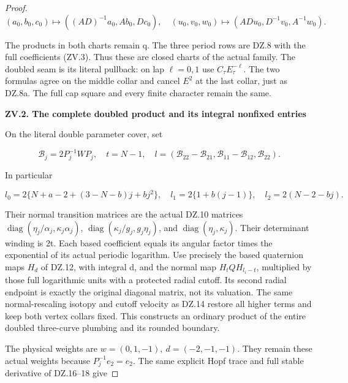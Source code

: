 \begin{proof}
\[
 (a_0,b_0,c_0)\mapsto((AD)^{-1}a_0,Ab_0,Dc_0),
 \quad(u_0,v_0,w_0)\mapsto(ADu_0,D^{-1}v_0,A^{-1}w_0).
                                                        \tag{ZV.4}
\]

The products in both charts remain q. The three period rows are
DZ.8 with the full coefficients (ZV.3). Thus these are closed charts
of the actual family. The doubled seam is its literal pullback:
on lap \(\ell=0,1\) use \(C_\tau E_\tau^{-\ell}\). The two formulas agree on the
middle collar and cancel \(E^2\) at the last collar, just as DZ.8a.
The full cap square and every finite character remain the same.

\par

\medskip\noindent\textbf{ZV.2. The complete doubled product and its integral nonfixed entries}

\par\nopagebreak[4]

On the literal double parameter cover, set

\[
 \mathcal B_j=2P_j^{-1}WP_j,
 \quad t=N-1,
 \quad l=(\mathcal B_{22}-\mathcal B_{21},
          \mathcal B_{11}-\mathcal B_{12},\mathcal B_{22}).
                                                        \tag{ZV.5}
\]

In particular

\[
 l_0=2\{N+a-2+(3-N-b)j+bj^2\},\quad
 l_1=2\{1+b(j-1)\},\quad l_2=2(N-2-bj).
                                                        \tag{ZV.6}
\]

Their normal transition matrices are the actual DZ.10 matrices
\(\operatorname{diag}(\eta_j/\alpha_j,\kappa_j\alpha_j)\),
\(\operatorname{diag}(\kappa_j/g_j,g_j\eta_j)\), and \(\operatorname{diag}(\eta_j,\kappa_j)\).
Their determinant winding is 2t. Each based coefficient equals its
angular factor times the exponential of its actual periodic logarithm.
Use precisely the based quaternion maps \(H_d\) of DZ.12, with integral
d, and the normal map \(H_t Q H_{l_i-t}\), multiplied by those full
logarithmic units with a protected radial cutoff. Its second radial
endpoint is exactly the original diagonal matrix, not its valuation.
The same normal-rescaling isotopy and cutoff velocity as DZ.14
restore all higher terms and keep both vertex collars fixed. This
constructs an ordinary product of the entire doubled three-curve
plumbing and its rounded boundary.

The physical weights are \(w=(0,1,-1),\ d=(-2,-1,-1)\). They remain
these actual weights because \(P_j^{-1}e_2=e_2\). The same explicit Hopf
trace and full stable derivative of DZ.16--18 give


\end{proof}
